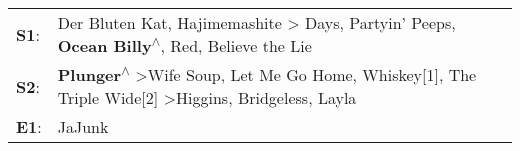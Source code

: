 \begin{supertabular}{p{0.03\textwidth}p{0.92\textwidth}}
 \textbf{S1}:  &                   Der Bluten Kat\textsuperscript{}, \enspace Hajimemashite\textsuperscript{} \textgreater {} Days\textsuperscript{}, \enspace Partyin' Peeps\textsuperscript{}, \enspace \textbf{Ocean Billy\textsuperscript{$\wedge$}}, \enspace Red\textsuperscript{}, \enspace Believe the Lie\textsuperscript{}  \enspace  \\
 \textbf{S2}:  &  \textbf{Plunger\textsuperscript{$\wedge$}} \textgreater \enspace Wife Soup\textsuperscript{}, \enspace Let Me Go Home, Whiskey[1]\textsuperscript{}, \enspace The Triple Wide[2]\textsuperscript{} \textgreater \enspace Higgins\textsuperscript{}, \enspace Bridgeless\textsuperscript{}, \enspace Layla\textsuperscript{}  \enspace  \\
 \textbf{E1}:  &                                                                                                                                                                                                                                                                                                     JaJunk\textsuperscript{}  \enspace  \\
\end{supertabular}
